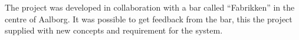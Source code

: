 The project was developed in collaboration with a bar called \enquote{Fabrikken} in the centre of Aalborg. It was possible to get feedback from the bar, this the project supplied with new concepts and requirement for the system.
